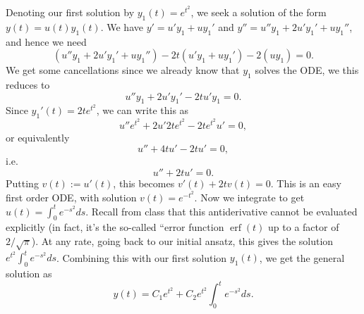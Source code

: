 \documentclass[addpoints]{exam}
\newcommand{\op}[1]{{\operatorname{#1}}}
\begin{document}
\begin{questions}
\begin{question}
\begin{parts}
\begin{solution}
Denoting our first solution by $y_1(t) = e^{t^2}$, we seek a solution of the form
$y(t) = u(t)y_1(t)$. 
We have $y' = u'y_1 + uy_1'$ and $y'' = u''y_1 + 2u'y_1' + uy_1''$, and hence we need
$$ (u''y_1 + 2u'y_1' + uy_1'') -2t(u'y_1 + uy_1') - 2 (uy_1) = 0.$$
We get some cancellations since we already know that $y_1$ solves the ODE, we this reduces to
$$ u''y_1 + 2u'y_1' - 2tu'y_1 = 0.$$
Since $y_1'(t) = 2te^{t^2}$, we can write this as
$$u'' e^{t^2} + 2u' 2te^{t^2} - 2te^{t^2}u' = 0,$$
or equivalently 
$$ u'' + 4tu' - 2tu' = 0,$$
i.e.
$$u'' + 2tu' = 0.$$
Putting $v(t) := u'(t)$, this becomes $v'(t) + 2tv(t) = 0$.
This is an easy first order ODE, with solution $v(t) = e^{-t^2}$.
Now we integrate to get $u(t) = \int_0^{t} e^{-s^2}ds$. Recall from class that this antiderivative cannot be evaluated explicitly (in fact, it's the so-called ``error function $\op{erf}(t)$ up to a factor of $2/\sqrt{\pi}$).
At any rate, going back to our initial ansatz, this gives the solution $e^{t^2}\int_0^{t} e^{-s^2}ds$.
Combining this with our first solution $y_1(t)$, we get the general solution as
$$y(t) = C_1 e^{t^2} + C_2e^{t^2}\int_0^{t} e^{-s^2}ds.$$



\end{solution}


\end{parts}


\end{question}




%
%










\end{questions}




\vspace{6cm}
\end{document}
